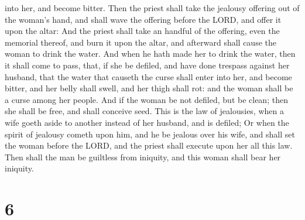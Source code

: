 into her, and become bitter.  Then the priest shall take
the jealousy offering out of the woman's hand, and shall wave the
offering before the LORD, and offer it upon the altar: 
And the priest shall take an handful of the offering, even the memorial
thereof, and burn it upon the altar, and afterward shall cause the woman
to drink the water.  And when he hath made her to drink
the water, then it shall come to pass, that, if she be defiled, and have
done trespass against her husband, that the water that causeth the curse
shall enter into her, and become bitter, and her belly shall swell, and
her thigh shall rot: and the woman shall be a curse among her people.
 And if the woman be not defiled, but be clean; then she
shall be free, and shall conceive seed.  This is the law
of jealousies, when a wife goeth aside to another instead of her
husband, and is defiled;  Or when the spirit of jealousy
cometh upon him, and he be jealous over his wife, and shall set the
woman before the LORD, and the priest shall execute upon her all this
law.  Then shall the man be guiltless from iniquity, and
this woman shall bear her iniquity.

\hypertarget{section-5}{%
\section{6}\label{section-5}}

